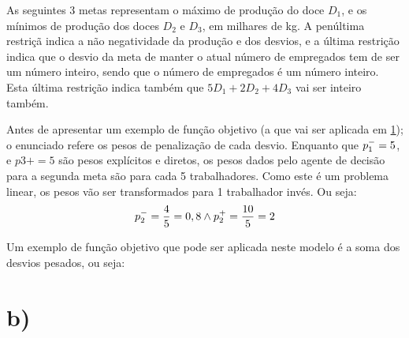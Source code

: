 As seguintes 3 metas representam o máximo de produção do doce $D_1$, e os mínimos de produção dos doces $D_2$ e $D_3$, em milhares de \unit{\kilogram}. A penúltima restriçã indica a não negatividade da produção e dos desvios, e a última restrição indica que o desvio da meta de manter o atual número de empregados tem de ser um número inteiro, sendo que o número de empregados é um número inteiro. Esta última restrição indica também que $5D_1 + 2D_2 + 4D_3$ vai ser inteiro também. 

Antes de apresentar um exemplo de função objetivo (a que vai ser aplicada em \ref{sec:b}); o enunciado refere os pesos de penalização de cada desvio. Enquanto que $p_{1}^{-} = 5$, e $p3+ = 5$ são pesos explícitos e diretos, os pesos dados pelo agente de decisão para a segunda meta são para cada 5 trabalhadores. Como este é um problema linear, os pesos vão ser transformados para 1 trabalhador invés. Ou seja:
$$
p_{2}^{-} = \frac{4}{5} = 0,8 \land p_{2}^{+} = \frac{10}{5} = 2
$$

Um exemplo de função objetivo que pode ser aplicada neste modelo é a soma dos desvios pesados, ou seja:

\section{b)} \label{sec:b}